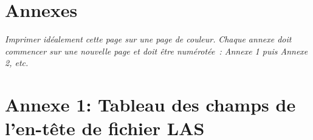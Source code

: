 \stopcontents[default]
\resumecontents[annexes]
\chapter*{Annexes}

\begin{center}
\textit{Imprimer idéalement cette page sur une page de couleur.}
\textit{Chaque annexe doit commencer sur une nouvelle page et doit être numérotée : Annexe 1 puis Annexe 2, etc.}
\end{center}


\chapter*{Annexe 1: Tableau des champs de l'en-tête de fichier LAS}
